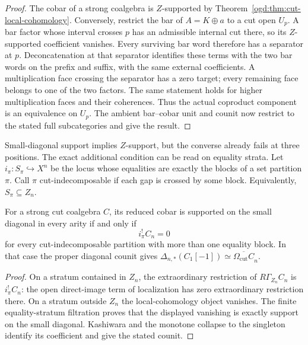 \begin{proof}
The cobar of a strong coalgebra is $Z$-supported by
Theorem~\ref{ogd:thm:cut-local-cohomology}.
Conversely, restrict the bar of $A=K\oplus a$ to a cut open $U_p$.
A bar factor whose interval crosses $p$ has an admissible internal cut
there, so its $Z$-supported coefficient vanishes.
Every surviving bar word therefore has a separator at $p$.
Deconcatenation at that separator identifies these terms with the two
bar words on the prefix and suffix, with the same external coefficients.
A multiplication face crossing the separator has a zero target; every
remaining face belongs to one of the two factors. The same statement
holds for higher multiplication faces and their coherences.
Thus the actual coproduct component is an equivalence on $U_p$.
The ambient bar--cobar unit and counit now restrict to the stated full
subcategories and give the result.
\end{proof}

Small-diagonal support implies $Z$-support, but the converse already
fails at three positions. The exact additional condition can be read
on equality strata. Let\label{ogd:def:equality-stratum-inclusion} $i_\pi:S_\pi\hookrightarrow X^n$ be the locus
whose equalities are exactly the blocks of a set partition $\pi$.
Call $\pi$ cut-indecomposable if each gap is crossed by some block.
Equivalently, $S_\pi\subseteq Z_n$.

\begin{corollary}\label{ogd:cor:cut-diagonal}
For a strong cut coalgebra $C$, its reduced cobar is supported on the
small diagonal in every arity if and only if
\[
 i_\pi^!C_n=0
\]
for every cut-indecomposable partition with more than one equality block.
In that case the proper diagonal counit gives
$\Delta_{n,*}(C_1[-1])\simeq\overline{\Omega_{\mathrm{cut}}C}_n$.
\end{corollary}

\begin{proof}
On a stratum contained in $Z_n$, the extraordinary restriction of
$R\Gamma_{Z_n}C_n$ is $i_\pi^!C_n$: the open direct-image term of
localization has zero extraordinary restriction there.
On a stratum outside $Z_n$ the local-cohomology object vanishes.
The finite equality-stratum filtration proves that the displayed
vanishing is exactly support on the small diagonal.
Kashiwara and the monotone collapse to the singleton identify its
coefficient and give the stated counit.
\end{proof}

